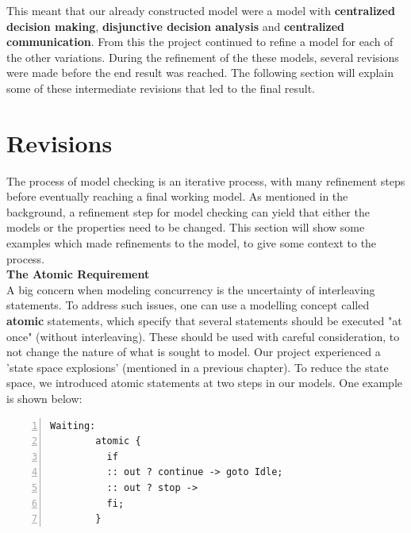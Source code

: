 This meant that our already constructed model were a model with \textbf{centralized decision making}, \textbf{disjunctive decision analysis} and \textbf{centralized communication}. From this the project continued to refine a model for each of the other variations. During the refinement of the these models, several revisions were made before the end result was reached. The following section will explain some of these intermediate revisions that led to the final result.


\section{Revisions}

The process of model checking is an iterative process, with many refinement steps before eventually reaching a final working model. As mentioned in the background, a refinement step for model checking can yield that either the models or the properties need to be changed. This section will show some examples which made refinements to the model, to give some context to the process. \\

\textbf{The Atomic Requirement} \\


A big concern when modeling concurrency is the uncertainty of interleaving statements. To address such issues, one can use a modelling concept called \textbf{atomic} statements, which specify that several statements should be executed "at once" (without interleaving). These should be used with careful consideration, to not change the nature of what is sought to model. Our project experienced a 'state space explosions' (mentioned in a previous chapter). To reduce the state space, we introduced atomic statements at two steps in our models. One example is shown below:

\begin{lstlisting}[caption={Atomic statement},language=Promela, numbers=left, basicstyle=\footnotesize, tabsize=2]
Waiting:
        atomic {
          if
          :: out ? continue -> goto Idle;
          :: out ? stop -> 
          fi;
        }
\end{lstlisting}

